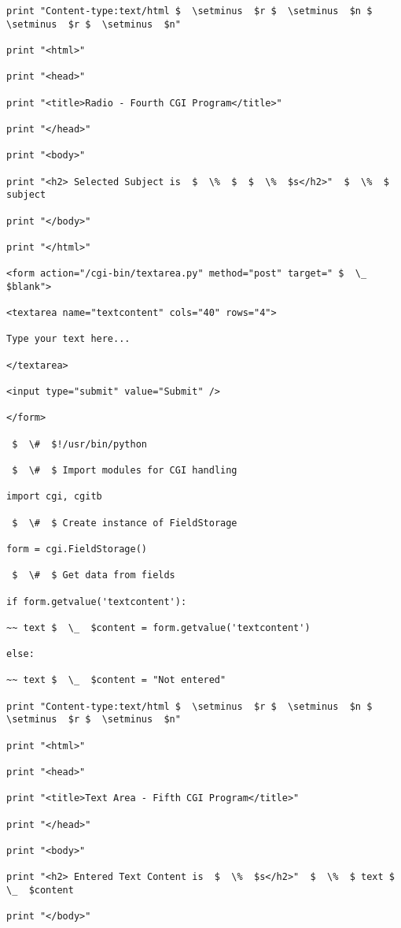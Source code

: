 \begin {enumerate}
\begin {enumerate}
\begin{verbatim}
print "Content-type:text/html $  \setminus  $r $  \setminus  $n $  \setminus  $r $  \setminus  $n"

print "<html>"

print "<head>"

print "<title>Radio - Fourth CGI Program</title>"

print "</head>"

print "<body>"

print "<h2> Selected Subject is  $  \%  $  $  \%  $s</h2>"  $  \%  $ subject

print "</body>"

print "</html>"

<form action="/cgi-bin/textarea.py" method="post" target=" $  \_  $blank">

<textarea name="textcontent" cols="40" rows="4">

Type your text here...

</textarea>

<input type="submit" value="Submit" />

</form>

 $  \#  $!/usr/bin/python

 $  \#  $ Import modules for CGI handling

import cgi, cgitb

 $  \#  $ Create instance of FieldStorage

form = cgi.FieldStorage()

 $  \#  $ Get data from fields

if form.getvalue('textcontent'):

~~ text $  \_  $content = form.getvalue('textcontent')

else:

~~ text $  \_  $content = "Not entered"

print "Content-type:text/html $  \setminus  $r $  \setminus  $n $  \setminus  $r $  \setminus  $n"

print "<html>"

print "<head>"

print "<title>Text Area - Fifth CGI Program</title>"

print "</head>"

print "<body>"

print "<h2> Entered Text Content is  $  \%  $s</h2>"  $  \%  $ text $  \_  $content

print "</body>"

\end{verbatim}


\end{enumerate}
\end{enumerate}
